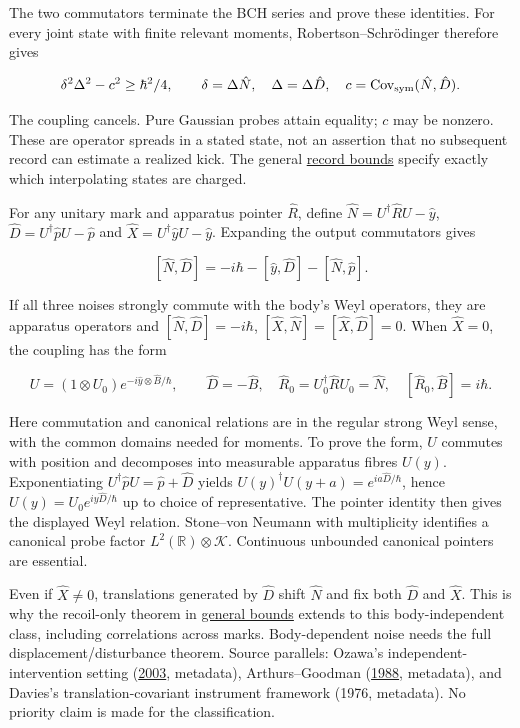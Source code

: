 \documentclass[11pt,a4paper]{article}
\begin{document}
The two commutators terminate the BCH series and prove these identities.
For every joint state with finite relevant moments,
Robertson--Schrödinger therefore gives

\[\delta^2\Delta^2-c^2\ge\hbar^2/4,\qquad
\delta=\Delta\hat N,\quad\Delta=\Delta\hat D,\quad
c=\operatorname{Cov}_{\rm sym}(\hat N,\hat D).\]

The coupling cancels. Pure Gaussian probes attain equality; \(c\) may be
nonzero. These are operator spreads in a stated state, not an assertion
that no subsequent record can estimate a realized kick. The general
\href{record-distance-path-length.md}{record bounds} specify exactly
which interpolating states are charged.

For any unitary mark and apparatus pointer \(\hat R\), define
\(\hat N=U^\dagger\hat RU-\hat y\), \(\hat D=U^\dagger\hat pU-\hat p\)
and \(\hat X=U^\dagger\hat yU-\hat y\). Expanding the output commutators
gives

\[[\hat N,\hat D]=-i\hbar-[\hat y,\hat D]-[\hat N,\hat p].\]

If all three noises strongly commute with the body's Weyl operators,
they are apparatus operators and \([\hat N,\hat D]=-i\hbar\),
\([\hat X,\hat N]=[\hat X,\hat D]=0\). When \(\hat X=0\), the coupling
has the form

\[U=(1\otimes U_0)e^{-i\hat y\otimes\hat B/\hbar},\qquad
\hat D=-\hat B,\quad\hat R_0=U_0^\dagger\hat RU_0=\hat N,\quad
[\hat R_0,\hat B]=i\hbar.\]

Here commutation and canonical relations are in the regular strong Weyl
sense, with the common domains needed for moments. To prove the form,
\(U\) commutes with position and decomposes into measurable apparatus
fibres \(U(y)\). Exponentiating \(U^\dagger\hat pU=\hat p+\hat D\)
yields \(U(y)^\dagger U(y+a)=e^{ia\hat D/\hbar}\), hence
\(U(y)=U_0e^{iy\hat D/\hbar}\) up to choice of representative. The
pointer identity then gives the displayed Weyl relation. Stone--von
Neumann with multiplicity identifies a canonical probe factor
\(L^2(\mathbb R)\otimes \mathcal K\). Continuous unbounded canonical
pointers are essential.

Even if \(\hat X\ne0\), translations generated by \(\hat D\) shift
\(\hat N\) and fix both \(\hat D\) and \(\hat X\). This is why the
recoil-only theorem in \href{record-distance-path-length.md}{general
bounds} extends to this body-independent class, including correlations
across marks. Body-dependent noise needs the full
displacement/disturbance theorem. Source parallels: Ozawa's
independent-intervention setting
(\href{https://doi.org/10.1103/PhysRevA.67.042105}{2003}, metadata),
Arthurs--Goodman
(\href{https://doi.org/10.1103/PhysRevLett.60.2447}{1988}, metadata),
and Davies's translation-covariant instrument framework (1976,
metadata). No priority claim is made for the classification.
\end{document}
